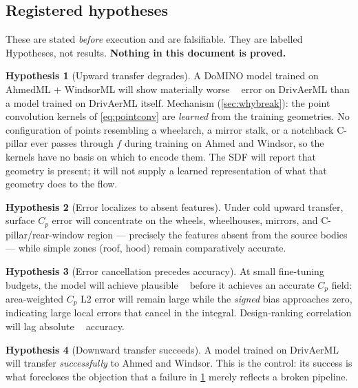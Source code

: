 \documentclass[10pt,a4paper]{article}
\theoremstyle{definition}
\newtheorem{hypothesis}{Hypothesis}[section]
\DeclareMathOperator{\Cd}{C_d}
\newcommand{\Cp}{{C_p}}
\begin{document}
\subsection{Registered hypotheses}

These are stated \emph{before} execution and are falsifiable. They are labelled
Hypotheses, not results. \textbf{Nothing in this document is proved.}

\begin{hypothesis}[Upward transfer degrades]
\label{hyp:degrade}
A DoMINO model trained on AhmedML + WindsorML will show materially worse $\Cd$
error on DrivAerML than a model trained on DrivAerML itself. Mechanism
(\cref{sec:whybreak}): the point convolution kernels of \cref{eq:pointconv} are
\emph{learned} from the training geometries. No configuration of points resembling a
wheelarch, a mirror stalk, or a notchback C-pillar ever passes through $f$ during
training on Ahmed and Windsor, so the kernels have no basis on which to encode them.
The SDF will report that geometry is present; it will not supply a learned
representation of what that geometry does to the flow.
\end{hypothesis}

\begin{hypothesis}[Error localizes to absent features]
\label{hyp:localize}
Under cold upward transfer, surface $\Cp$ error will concentrate on the wheels,
wheelhouses, mirrors, and C-pillar/rear-window region --- precisely the features
absent from the source bodies --- while simple zones (roof, hood) remain
comparatively accurate.
\end{hypothesis}

\begin{hypothesis}[Error cancellation precedes accuracy]
\label{hyp:cancel}
At small fine-tuning budgets, the model will achieve plausible $\Cd$ before it
achieves an accurate $\Cp$ field: area-weighted $\Cp$ L2 error will remain large
while the \emph{signed} bias approaches zero, indicating large local errors that
cancel in the integral. Design-ranking correlation will lag absolute $\Cd$
accuracy.
\end{hypothesis}

\begin{hypothesis}[Downward transfer succeeds]
\label{hyp:downward}
A model trained on DrivAerML will transfer \emph{successfully} to Ahmed and
Windsor. This is the control: its success is what forecloses the objection that a
failure in \cref{hyp:degrade} merely reflects a broken pipeline.
\end{hypothesis}
\end{document}
